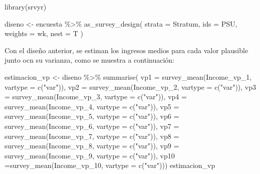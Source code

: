 \documentclass[
  12pt,
]{book}
\newenvironment{Shaded}{\begin{snugshade}}{\end{snugshade}}
\newcommand{\AttributeTok}[1]{\textcolor[rgb]{0.77,0.63,0.00}{#1}}
\newcommand{\FunctionTok}[1]{\textcolor[rgb]{0.00,0.00,0.00}{#1}}
\newcommand{\NormalTok}[1]{#1}
\newcommand{\OtherTok}[1]{\textcolor[rgb]{0.56,0.35,0.01}{#1}}
\newcommand{\SpecialCharTok}[1]{\textcolor[rgb]{0.00,0.00,0.00}{#1}}
\newcommand{\StringTok}[1]{\textcolor[rgb]{0.31,0.60,0.02}{#1}}
\begin{document}
\begin{Shaded}
\begin{Highlighting}[]
\FunctionTok{library}\NormalTok{(srvyr)}

\NormalTok{diseno }\OtherTok{\textless{}{-}}\NormalTok{ encuesta }\SpecialCharTok{\%\textgreater{}\%}
  \FunctionTok{as\_survey\_design}\NormalTok{(}
    \AttributeTok{strata =}\NormalTok{ Stratum,}
    \AttributeTok{ids =}\NormalTok{ PSU,}
    \AttributeTok{weights =}\NormalTok{ wk,}
    \AttributeTok{nest =}\NormalTok{ T}
\NormalTok{  )}
\end{Highlighting}
\end{Shaded}

Con el diseño anterior, se estiman los ingresos medios para cada valor plausible junto ocn su varianza, como se muestra a continuación:

\begin{Shaded}
\begin{Highlighting}[]
\NormalTok{estimacion\_vp }\OtherTok{\textless{}{-}}\NormalTok{  diseno }\SpecialCharTok{\%\textgreater{}\%} 
 \FunctionTok{summarise}\NormalTok{(}
   \AttributeTok{vp1 =} \FunctionTok{survey\_mean}\NormalTok{(Income\_vp\_1, }\AttributeTok{vartype =} \FunctionTok{c}\NormalTok{(}\StringTok{"var"}\NormalTok{)),}
   \AttributeTok{vp2 =} \FunctionTok{survey\_mean}\NormalTok{(Income\_vp\_2, }\AttributeTok{vartype =} \FunctionTok{c}\NormalTok{(}\StringTok{"var"}\NormalTok{)),}
   \AttributeTok{vp3 =} \FunctionTok{survey\_mean}\NormalTok{(Income\_vp\_3, }\AttributeTok{vartype =} \FunctionTok{c}\NormalTok{(}\StringTok{"var"}\NormalTok{)),}
   \AttributeTok{vp4 =} \FunctionTok{survey\_mean}\NormalTok{(Income\_vp\_4, }\AttributeTok{vartype =} \FunctionTok{c}\NormalTok{(}\StringTok{"var"}\NormalTok{)),}
   \AttributeTok{vp5 =} \FunctionTok{survey\_mean}\NormalTok{(Income\_vp\_5, }\AttributeTok{vartype =} \FunctionTok{c}\NormalTok{(}\StringTok{"var"}\NormalTok{)),}
   \AttributeTok{vp6 =} \FunctionTok{survey\_mean}\NormalTok{(Income\_vp\_6, }\AttributeTok{vartype =} \FunctionTok{c}\NormalTok{(}\StringTok{"var"}\NormalTok{)),}
   \AttributeTok{vp7 =} \FunctionTok{survey\_mean}\NormalTok{(Income\_vp\_7, }\AttributeTok{vartype =} \FunctionTok{c}\NormalTok{(}\StringTok{"var"}\NormalTok{)),}
   \AttributeTok{vp8 =} \FunctionTok{survey\_mean}\NormalTok{(Income\_vp\_8, }\AttributeTok{vartype =} \FunctionTok{c}\NormalTok{(}\StringTok{"var"}\NormalTok{)),}
   \AttributeTok{vp9 =} \FunctionTok{survey\_mean}\NormalTok{(Income\_vp\_9, }\AttributeTok{vartype =} \FunctionTok{c}\NormalTok{(}\StringTok{"var"}\NormalTok{)),}
   \AttributeTok{vp10 =}\FunctionTok{survey\_mean}\NormalTok{(Income\_vp\_10, }\AttributeTok{vartype =} \FunctionTok{c}\NormalTok{(}\StringTok{"var"}\NormalTok{)))}
\NormalTok{estimacion\_vp}
\end{Highlighting}
\end{Shaded}
\end{document}
